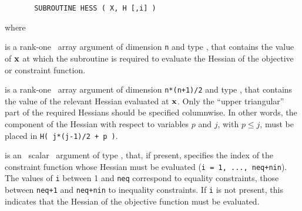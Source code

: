 \documentclass{galahad}
\begin{document}
\def\baselinestretch{0.8}
{\tt \begin{verbatim}
       SUBROUTINE HESS ( X, H [,i] )
\end{verbatim} }
\def\baselinestretch{1.0}
\noindent
where
\begin{description}
 is a rank-one \intentin\ array argument of
dimension {\tt n} and type \realdp,
that contains the value of ${\mathbf{x}}$ at which the
subroutine is required to evaluate the Hessian
of the objective or constraint function.

 is a rank-one \intentout\ array argument of dimension {\tt n*(n+1)/2}
  and type \realdp, that contains the value of the relevant
  Hessian evaluated at ${\mathbf{x}}$. Only the ``upper triangular'' part of the
  required Hessians should be specified columnwise. In other words, the
  component of the Hessian with respect to  variables $p$ and $j$, with
  $p \leq j$, must be  placed in {\tt H( j*(j-1)/2 + p )}.

 is an \optional\ scalar \intentin\ argument of type \integer,
that, if present, specifies the index of the constraint function whose
Hessian must be evaluated  ({\tt i = 1, ..., neq+nin}). The values of {\tt i}
between 1 and {\tt neq} correspond to equality constraints, those between
{\tt neq+1} and {\tt neq+nin} to inequality constraints.
If {\tt i} is not
present, this indicates that the Hessian of the objective function must be
evaluated.
\end{description}

\galerrors\label{serrors}
\end{document}
